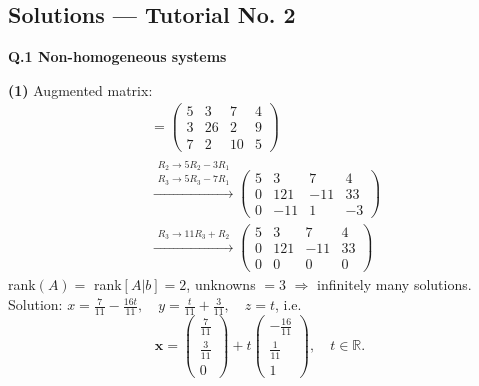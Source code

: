 \subsection*{Solutions --- Tutorial No. 2}
\medskip\noindent\textbf{Q.1  Non-homogeneous systems}\par\smallskip

\noindent\textbf{(1)} Augmented matrix:
\begin{align*}
[A|b] &= \left(\begin{array}{ccc|c}5 & 3 & 7 & 4 \\ 3 & 26 & 2 & 9 \\ 7 & 2 & 10 & 5\end{array}\right) \\
&\xrightarrow{\substack{R_2\to 5R_2-3R_1\\ R_3\to 5R_3-7R_1}} \left(\begin{array}{ccc|c}5 & 3 & 7 & 4 \\ 0 & 121 & -11 & 33 \\ 0 & -11 & 1 & -3\end{array}\right) \\
&\xrightarrow{\substack{R_3\to 11R_3+R_2}} \left(\begin{array}{ccc|c}5 & 3 & 7 & 4 \\ 0 & 121 & -11 & 33 \\ 0 & 0 & 0 & 0\end{array}\right)
\end{align*}
rank$(A)=$ rank$[A|b]=2$, unknowns $=3$ $\Rightarrow$ infinitely many solutions. Solution: $x=\frac{7}{11} - \frac{16 t}{11}, \quad y=\frac{t}{11} + \frac{3}{11}, \quad z=t$, i.e. \[ \mathbf{x}=\begin{pmatrix}\frac{7}{11} \\ \frac{3}{11} \\ 0\end{pmatrix} + t\begin{pmatrix}- \frac{16}{11} \\ \frac{1}{11} \\ 1\end{pmatrix}, \quad t\in\mathbb{R}. \]

